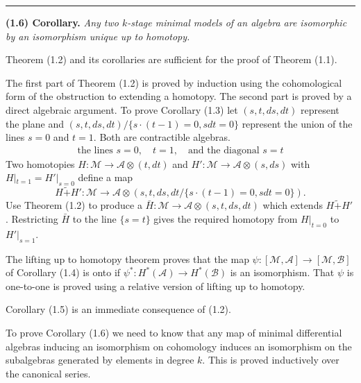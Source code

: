 \documentclass[
  english,
  a3paper,
  a3paper]{extarticle}
\begin{document}
\clearpage



\par

\vspace{0.7mm}\hrule\vspace{1.6mm}

\fontsize{9}{11}\selectfont

\textbf{(1.6) Corollary.} \emph{Any two \(k\)-stage minimal models of an
algebra are isomorphic by an isomorphism unique up to homotopy.}

Theorem (1.2) and its corollaries are sufficient for the proof of
Theorem (1.1).

The first part of Theorem (1.2) is proved by induction using the
cohomological form of the obstruction to extending a homotopy. The
second part is proved by a direct algebraic argument. To prove Corollary
(1.3) let \((s,t,ds,dt)\) represent the plane and
\((s,t,ds,dt)/\{s\cdot(t-1)=0,sdt=0\}\) represent the union of the lines
\(s=0\) and \(t=1\). Both are contractible algebras. \[
\begin{array}{c}
\text{the lines }s=0,\quad t=1,\quad\text{and the diagonal }s=t
\end{array}
\] Two homotopies \(H:\mathcal M\to\mathscr A\otimes(t,dt)\) and
\(H':\mathcal M\to\mathscr A\otimes(s,ds)\) with \(H|_{t=1}=H'|_{s=0}\)
define a map \[
H\mathrel{\widetilde{+}}H':\mathcal M\to\mathscr A\otimes(s,t,ds,dt/\{s\cdot(t-1)=0,sdt=0\}).
\] Use Theorem (1.2) to produce a
\(\bar H:\mathcal M\to\mathscr A\otimes(s,t,ds,dt)\) which extends
\(H\mathrel{\widetilde{+}}H'\). Restricting \(\bar H\) to the line
\(\{s=t\}\) gives the required homotopy from \(H|_{t=0}\) to
\(H'|_{s=1}\).

The lifting up to homotopy theorem proves that the map
\(\psi:[\mathcal M,\mathscr A]\to[\mathcal M,\mathscr B]\) of Corollary
(1.4) is onto if \(\psi^*:H^*(\mathscr A)\to H^*(\mathscr B)\) is an
isomorphism. That \(\psi\) is one-to-one is proved using a relative
version of lifting up to homotopy.

Corollary (1.5) is an immediate consequence of (1.2).

To prove Corollary (1.6) we need to know that any map of minimal
differential algebras inducing an isomorphism on cohomology induces an
isomorphism on the subalgebras generated by elements in degree \(k\).
This is proved inductively over the canonical series.
\end{document}
